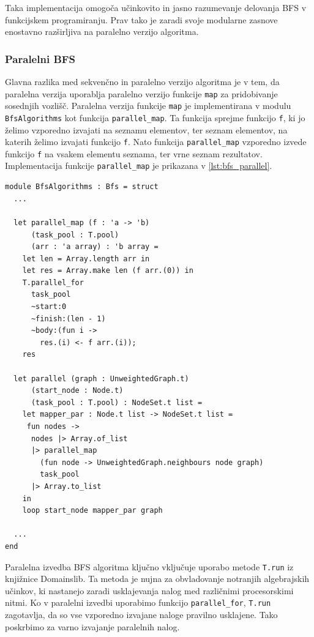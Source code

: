 \documentclass[mat1, tisk]{fmfdelo}
\begin{document}
Taka implementacija omogoča učinkovito in jasno razumevanje delovanja BFS v funkcijskem programiranju. Prav tako je zaradi
svoje modularne zasnove enostavno razširljiva na paralelno verzijo algoritma.

\subsubsection{Paralelni BFS}

Glavna razlika med sekvenčno in paralelno verzijo algoritma je v tem, da paralelna verzija uporablja paralelno verzijo
funkcije \texttt{map} za pridobivanje sosednjih vozlišč. Paralelna verzija funkcije \texttt{map} je implementirana
v modulu \texttt{BfsAlgorithms} kot funkcija \texttt{parallel\_map}. Ta funkcija sprejme funkcijo \texttt{f}, ki jo
želimo vzporedno izvajati na seznamu elementov, ter seznam elementov, na katerih želimo izvajati funkcijo \texttt{f}.
Nato funkcija \texttt{parallel\_map} vzporedno izvede funkcijo \texttt{f} na vsakem elementu seznama, ter vrne seznam
rezultatov. Implementacija funkcije \texttt{parallel\_map} je prikazana v \ref{lst:bfs_parallel}.

\begin{lstlisting}[label=lst:bfs_parallel]
module BfsAlgorithms : Bfs = struct
  ...

  let parallel_map (f : 'a -> 'b)
      (task_pool : T.pool)
      (arr : 'a array) : 'b array =
    let len = Array.length arr in
    let res = Array.make len (f arr.(0)) in
    T.parallel_for 
      task_pool 
      ~start:0 
      ~finish:(len - 1) 
      ~body:(fun i ->
        res.(i) <- f arr.(i));
    res

  let parallel (graph : UnweightedGraph.t)
      (start_node : Node.t)
      (task_pool : T.pool) : NodeSet.t list =
    let mapper_par : Node.t list -> NodeSet.t list =
     fun nodes ->
      nodes |> Array.of_list
      |> parallel_map
        (fun node -> UnweightedGraph.neighbours node graph)
        task_pool
      |> Array.to_list
    in
    loop start_node mapper_par graph

  ...
end

\end{lstlisting}

Paralelna izvedba BFS algoritma ključno vključuje uporabo metode \texttt{T.run} iz knjižnice Domainslib. Ta metoda je
nujna za obvladovanje notranjih algebrajskih učinkov, ki nastanejo zaradi usklajevanja nalog med različnimi procesorskimi nitmi.
Ko v paralelni izvedbi uporabimo funkcijo \texttt{parallel\_for}, \texttt{T.run} zagotavlja, da so vse vzporedno
izvajane naloge pravilno usklajene. Tako poskrbimo za varno izvajanje paralelnih nalog.
\end{document}
